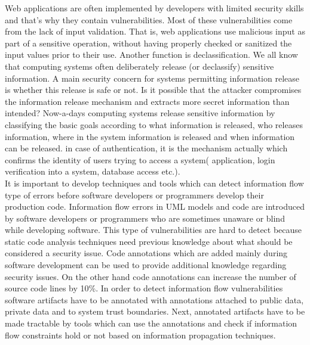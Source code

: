Web applications are often implemented by developers with limited security skills and that's why they contain vulnerabilities. Most of these vulnerabilities come from the lack of input validation. That is, web applications use malicious input as part of a sensitive operation, without having properly checked or sanitized the input values
prior to their use. Another function is declassification. We all know that computing systems often deliberately release (or declassify) sensitive information. A main security concern for systems permitting information release is whether this release is safe or not. Is it possible that the attacker compromises the information release mechanism and extracts more secret information than intended? Now-a-days computing systems release sensitive information by classifying the basic goals according to what information is released, who releases information, where in the system information is released and when information can be released. in case of authentication, it is the mechanism actually which confirms the identity of users trying to access a system( application, login verification into a system, database access etc.). \\

It is important to develop techniques and tools which can detect information flow type of errors before software developers or programmers develop their production code. Information flow errors in UML models and code are introduced by software developers or programmers who are sometimes unaware or blind while developing software. This type of vulnerabilities are hard to detect because static code analysis techniques need previous knowledge about what should be considered a security issue. Code annotations which are added mainly during software development \cite{ref_18_chess2004static} can be used to provide additional knowledge regarding security issues. On the other hand code annotations can increase the number of source code lines by 10\%. In order to detect information flow vulnerabilities software artifacts have to be annotated with annotations attached to public data, private data and to system trust boundaries. Next, annotated artifacts have to be made tractable by tools which can use the annotations and check if information flow constraints hold or not based on information propagation techniques.\\

